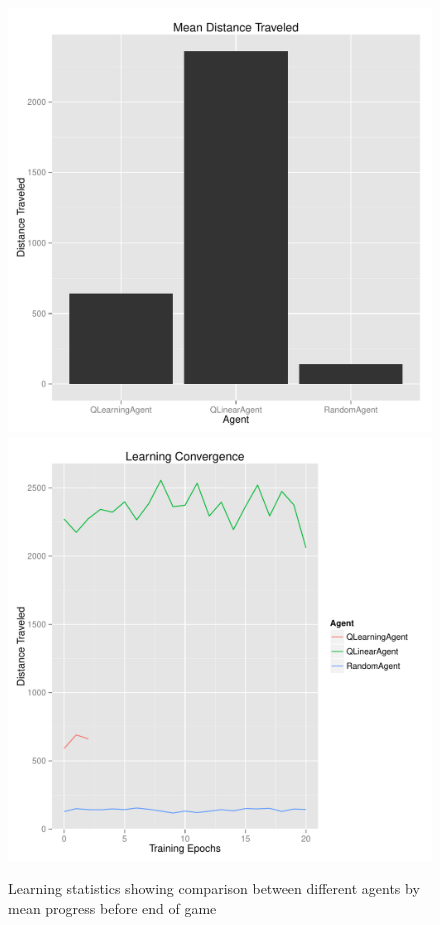 \documentclass[12pt]{article}
\begin{document}
\begin{figure}
\includegraphics[scale=0.5]{imgs/dist_bar.pdf}
\includegraphics[scale=0.5]{imgs/dist_line.pdf}
\caption{Learning statistics showing comparison between different agents by mean progress before end of game}
\label{agent_comp}
\end{figure}
\end{document}
